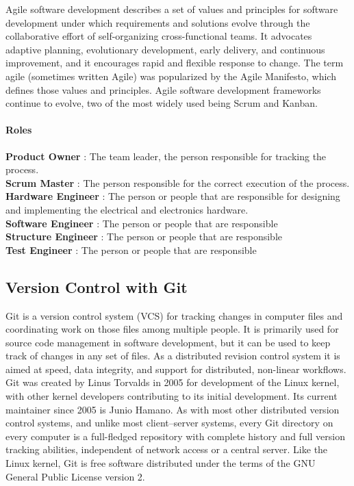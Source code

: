 Agile software development describes a set of values and principles for software development under which requirements and solutions evolve through the collaborative effort of self-organizing cross-functional teams. It advocates adaptive planning, evolutionary development, early delivery, and continuous improvement, and it encourages rapid and flexible response to change.
The term agile (sometimes written Agile) was popularized by the Agile Manifesto, which defines those values and principles. Agile software development frameworks continue to evolve, two of the most widely used being Scrum and Kanban.

\paragraph{Roles}
\textbf{Product Owner} :  The team leader, the person responsible for tracking the process. \\
\textbf{Scrum Master} : The person responsible for the correct execution of the process. \\
\textbf{Hardware Engineer} : The person or people that are responsible for designing and implementing the electrical and electronics hardware.\\
\textbf{ Software Engineer} : The person or people that are responsible \\ 
\textbf{Structure Engineer} : The person or people that are responsible  \\
\textbf{Test Engineer} : The person or people that are responsible 
\subsection{Version Control with Git}
\-
\indent Git is a version control system (VCS) for tracking changes in computer files and coordinating work on those files among multiple people. It is primarily used for source code management in software development, but it can be used to keep track of changes in any set of files. As a distributed revision control system it is aimed at speed, data integrity, and support for distributed, non-linear workflows.
Git was created by Linus Torvalds in 2005 for development of the Linux kernel, with other kernel developers contributing to its initial development. Its current maintainer since 2005 is Junio Hamano.
As with most other distributed version control systems, and unlike most client–server systems, every Git directory on every computer is a full-fledged repository with complete history and full version tracking abilities, independent of network access or a central server.
Like the Linux kernel, Git is free software distributed under the terms of the GNU General Public License version 2.

